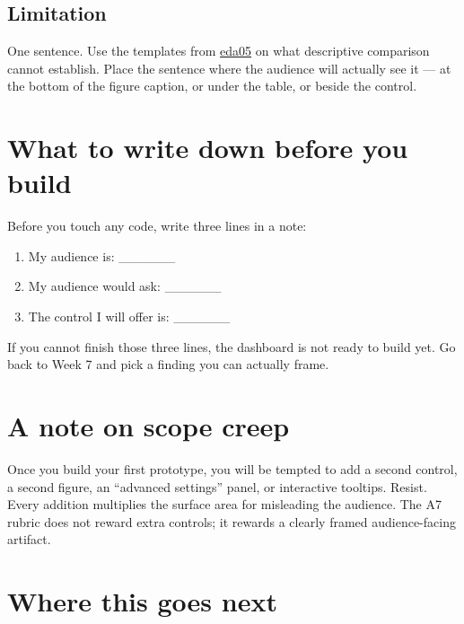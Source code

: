 \documentclass[
  letterpaper,
  DIV=11,
  numbers=noendperiod,
  oneside]{scrreprt}
\providecommand{\tightlist}{%
  \setlength{\itemsep}{0pt}\setlength{\parskip}{0pt}}
\begin{document}
\subsection*{Limitation}\label{limitation}

One sentence. Use the templates from
\hyperref[four-audit-categories-for-ai-drafted-eda]{eda05} on what
descriptive comparison cannot establish. Place the sentence where the
audience will actually see it --- at the bottom of the figure caption,
or under the table, or beside the control.

\section*{What to write down before you
build}\label{what-to-write-down-before-you-build}


Before you touch any code, write three lines in a note:

\begin{enumerate}
\def\labelenumi{\arabic{enumi}.}
\tightlist
\item
  My audience is: \_\_\_\_\_\_
\item
  My audience would ask: \_\_\_\_\_\_
\item
  The control I will offer is: \_\_\_\_\_\_
\end{enumerate}

If you cannot finish those three lines, the dashboard is not ready to
build yet. Go back to Week 7 and pick a finding you can actually frame.

\section*{A note on scope creep}\label{a-note-on-scope-creep}


Once you build your first prototype, you will be tempted to add a second
control, a second figure, an ``advanced settings'' panel, or interactive
tooltips. Resist. Every addition multiplies the surface area for
misleading the audience. The A7 rubric does not reward extra controls;
it rewards a clearly framed audience-facing artifact.

\section*{Where this goes next}\label{where-this-goes-next-15}
\end{document}
